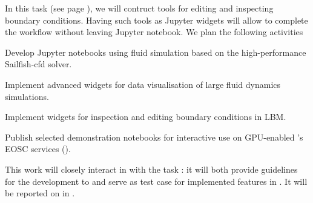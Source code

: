 \begin{task}[
  title=Demonstrator: Visualisation and control of fluid dynamics in Jupyter notebook,
  id=application-gpu,
  lead=SIL,
  PM=12,
  wphases={4-36},
  partners={EGI}
]


In this task (see page \pageref{sec:concept-demonstrator-gpu}), we will contruct tools for editing and inspecting
boundary conditions. Having such tools as Jupyter widgets will allow
to complete the workflow without leaving Jupyter notebook. We plan the
following activities
\begin{compactitem}
\item Develop Jupyter notebooks using fluid
  simulation based on the high-performance Sailfish-cfd solver.
\item Implement advanced widgets for data visualisation of large
  fluid dynamics simulations.
\item Implement widgets for inspection and editing boundary
  conditions in LBM.
  \item Publish selected demonstration notebooks for interactive use on
    GPU-enabled \TheProject's EOSC services ().
\end{compactitem}

This work will closely interact in with the task
: it will both provide guidelines
for the development to  and serve
as test case for implemented features in
.
%
  It will be reported on in
  .
\end{task}
